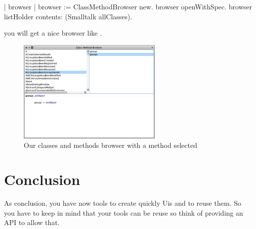 \documentclass[a4paper,10pt,twoside]{book}
\begin{document}
\begin{code}{}
| browser |
browser := ClassMethodBrowser new.
browser openWithSpec.
browser listHolder contents: (Smalltalk allClasses).
\end{code}
you will get a nice browser like .


\begin{figure}[ht]
\begin{center}
	\includegraphics[width=7cm]{MethodBrowser5}
	\caption{Our classes and methods browser with a method selected}
\end{center}
\end{figure}

\section{Conclusion}

As conclusion, you have now tools to create quickly Uis and to reuse them.
So you have to keep in mind that your tools can be reuse so think of providing an API to allow that.

\ifx\wholebook\relax\else
   
   
\end{document}
